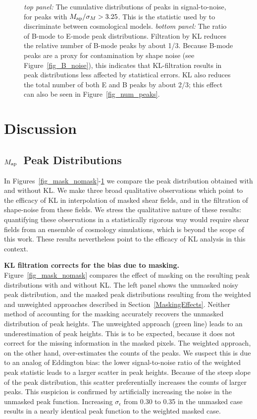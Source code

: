 \documentclass[twocolumn]{emulateapj}
\newcommand{\Map}{\ensuremath{M_{\rm ap}}\ }
\begin{document}
\begin{figure} 
 \centering
 \caption{
   \textit{top panel:} The cumulative distributions of peaks in 
   signal-to-noise, for peaks with $M_{\rm ap}/\sigma_M > 3.25$.
   This is the statistic used by \citet{Dietrich10} to discriminate
   between cosmological models.  \textit{bottom panel:}  The ratio
   of B-mode to E-mode peak distributions.  Filtration by KL reduces
   the relative number of B-mode peaks by about 1/3.  Because B-mode
   peaks are a proxy for contamination by shape noise
   (see Figure~\ref{fig_B_noise}), this indicates that KL-filtration
   results in peak distributions less affected by statistical errors.
   KL also reduces the total number of both E and B peaks by about 2/3; 
   this effect can also be seen in Figure~\ref{fig_num_peaks}.
   \label{fig_EB_comp} 
 }
\end{figure}

\section{Discussion}
\label{Discussion}
\subsection{\Map Peak Distributions}
In Figures~\ref{fig_mask_nomask}-\ref{fig_EB_comp}
we compare the peak distribution obtained with and without KL.
We make three broad qualitative observations which point to the
efficacy of KL in interpolation of masked shear fields, and in
the filtration of shape-noise from these fields.  We stress the
qualitative nature of these results: quantifying 
these observations in a statistically rigorous way would require
shear fields from an ensemble of cosmology simulations, which is beyond the
scope of this work.  These results nevertheless point to the
efficacy of KL analysis in this context.

\textbf{KL filtration corrects for the bias due to masking.}
Figure~\ref{fig_mask_nomask} compares the effect of masking on the
resulting peak distributions with and without KL.  The left panel
shows the unmasked noisy peak distribution, and the masked
peak distributions resulting from the weighted and unweighted
approaches described in Section~\ref{MaskingEffects}.  
Neither method of accounting for the masking accurately 
recovers the unmasked distribution of peak heights. The unweighted
approach (green line) leads to an underestimation of peak heights.  
This is to be expected, because it does not correct for the missing 
information in the masked pixels.  The weighted approach, on the other
hand, over-estimates the counts of the peaks.  We suspect
this is due to an analog of Eddington bias: the lower signal-to-noise 
ratio of the weighted peak statistic leads to a larger scatter in peak heights.
Because of the steep slope of the peak distribution, this scatter 
preferentially increases the counts of larger peaks.  This suspicion is
confirmed by artificially increasing the noise in the unmasked peak function.
Increasing $\sigma_\epsilon$ from 0.30 to 0.35 in the unmasked case
results in a nearly identical peak function to the weighted masked case.
\end{document}
